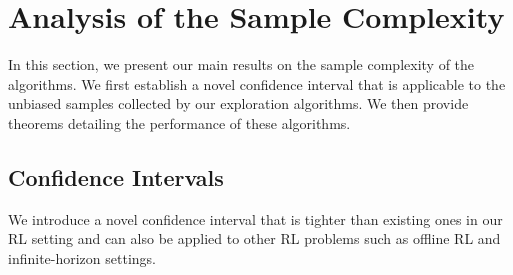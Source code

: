 \section{Analysis of the Sample Complexity}\label{sec:anal}

In this section, we present our main results on the sample complexity of the algorithms. We first establish a novel confidence interval that is applicable to the unbiased samples collected by our exploration algorithms. We then provide theorems detailing the performance of these algorithms. 


\subsection{Confidence Intervals}
We introduce a novel confidence interval that is tighter than existing ones in our RL setting and can also be applied to other RL problems such as offline RL and infinite-horizon settings.
%
